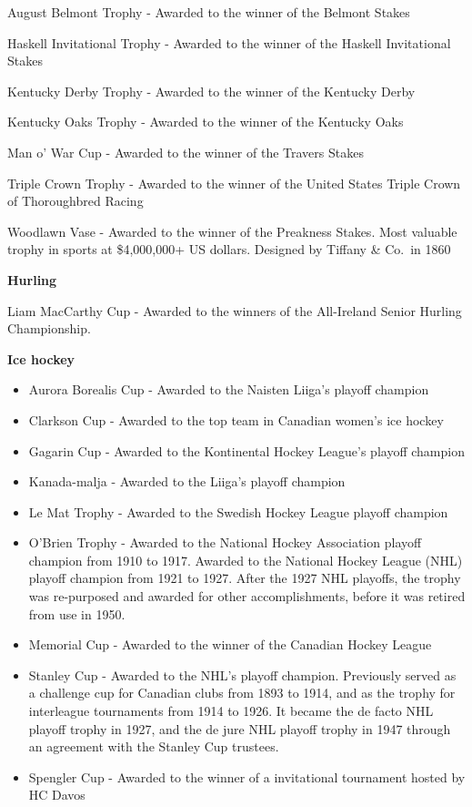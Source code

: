\documentclass[
  openany]{book}
\providecommand{\tightlist}{%
  \setlength{\itemsep}{0pt}\setlength{\parskip}{0pt}}
\begin{document}
August Belmont Trophy - Awarded to the winner of the Belmont Stakes

Haskell Invitational Trophy - Awarded to the winner of the Haskell Invitational Stakes

Kentucky Derby Trophy - Awarded to the winner of the Kentucky Derby

Kentucky Oaks Trophy - Awarded to the winner of the Kentucky Oaks

Man o' War Cup - Awarded to the winner of the Travers Stakes

Triple Crown Trophy - Awarded to the winner of the United States Triple Crown of Thoroughbred Racing

Woodlawn Vase - Awarded to the winner of the Preakness Stakes. Most valuable trophy in sports at \$4,000,000+ US dollars. Designed by Tiffany \& Co.~in 1860

\textbf{Hurling}

Liam MacCarthy Cup - Awarded to the winners of the All-Ireland Senior Hurling Championship.

\textbf{Ice hockey}

\begin{itemize}
\tightlist
\item
  Aurora Borealis Cup - Awarded to the Naisten Liiga's playoff champion
\item
  Clarkson Cup - Awarded to the top team in Canadian women's ice hockey
\item
  Gagarin Cup - Awarded to the Kontinental Hockey League's playoff champion
\item
  Kanada-malja - Awarded to the Liiga's playoff champion
\item
  Le Mat Trophy - Awarded to the Swedish Hockey League playoff champion
\item
  O'Brien Trophy - Awarded to the National Hockey Association playoff champion from 1910 to 1917. Awarded to the National Hockey League (NHL) playoff champion from 1921 to 1927. After the 1927 NHL playoffs, the trophy was re-purposed and awarded for other accomplishments, before it was retired from use in 1950.
\item
  Memorial Cup - Awarded to the winner of the Canadian Hockey League
\item
  Stanley Cup - Awarded to the NHL's playoff champion. Previously served as a challenge cup for Canadian clubs from 1893 to 1914, and as the trophy for interleague tournaments from 1914 to 1926. It became the de facto NHL playoff trophy in 1927, and the de jure NHL playoff trophy in 1947 through an agreement with the Stanley Cup trustees.
\item
  Spengler Cup - Awarded to the winner of a invitational tournament hosted by HC Davos
\end{itemize}
\end{document}
